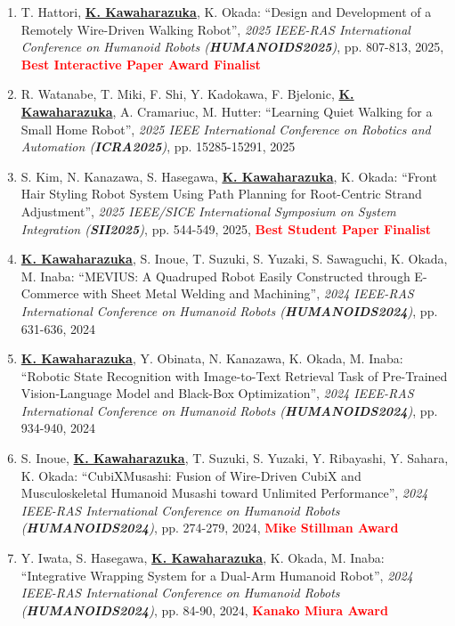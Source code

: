 \documentclass[letterpaper,11pt]{article}
\begin{document}
\begin{enumerate}
\item T. Hattori, \underline{\textbf{K. Kawaharazuka}}, K. Okada: ``Design and Development of a Remotely Wire-Driven Walking Robot'', \textit{2025 IEEE-RAS International Conference on Humanoid Robots (\textit{\textbf{HUMANOIDS2025}})}, pp. 807-813, 2025, \textbf{\textcolor{red}{Best Interactive Paper Award Finalist}}
\item R. Watanabe, T. Miki, F. Shi, Y. Kadokawa, F. Bjelonic, \underline{\textbf{K. Kawaharazuka}}, A. Cramariuc, M. Hutter: ``Learning Quiet Walking for a Small Home Robot'', \textit{2025 IEEE International Conference on Robotics and Automation (\textit{\textbf{ICRA2025}})}, pp. 15285-15291, 2025
\item S. Kim, N. Kanazawa, S. Hasegawa, \underline{\textbf{K. Kawaharazuka}}, K. Okada: ``Front Hair Styling Robot System Using Path Planning for Root-Centric Strand Adjustment'', \textit{2025 IEEE/SICE International Symposium on System Integration (\textit{\textbf{SII2025}})}, pp. 544-549, 2025, \textbf{\textcolor{red}{Best Student Paper Finalist}}
\item \underline{\textbf{K. Kawaharazuka}}, S. Inoue, T. Suzuki, S. Yuzaki, S. Sawaguchi, K. Okada, M. Inaba: ``MEVIUS: A Quadruped Robot Easily Constructed through E-Commerce with Sheet Metal Welding and Machining'', \textit{2024 IEEE-RAS International Conference on Humanoid Robots (\textit{\textbf{HUMANOIDS2024}})}, pp. 631-636, 2024
\item \underline{\textbf{K. Kawaharazuka}}, Y. Obinata, N. Kanazawa, K. Okada, M. Inaba: ``Robotic State Recognition with Image-to-Text Retrieval Task of Pre-Trained Vision-Language Model and Black-Box Optimization'', \textit{2024 IEEE-RAS International Conference on Humanoid Robots (\textit{\textbf{HUMANOIDS2024}})}, pp. 934-940, 2024
\item S. Inoue, \underline{\textbf{K. Kawaharazuka}}, T. Suzuki, S. Yuzaki, Y. Ribayashi, Y. Sahara, K. Okada: ``CubiXMusashi: Fusion of Wire-Driven CubiX and Musculoskeletal Humanoid Musashi toward Unlimited Performance'', \textit{2024 IEEE-RAS International Conference on Humanoid Robots (\textit{\textbf{HUMANOIDS2024}})}, pp. 274-279, 2024, \textbf{\textcolor{red}{Mike Stillman Award}}
\item Y. Iwata, S. Hasegawa, \underline{\textbf{K. Kawaharazuka}}, K. Okada, M. Inaba: ``Integrative Wrapping System for a Dual-Arm Humanoid Robot'', \textit{2024 IEEE-RAS International Conference on Humanoid Robots (\textit{\textbf{HUMANOIDS2024}})}, pp. 84-90, 2024, \textbf{\textcolor{red}{Kanako Miura Award}}

\end{enumerate}
\end{document}
